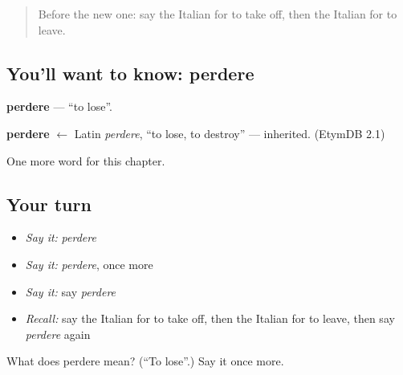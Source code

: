 \label{lesson:IT-C234-perdere}



\begin{quote}
Before the new one: say the Italian for to take off, then the Italian for to leave.
\end{quote}

\subsection*{You'll want to know: perdere}
\textbf{perdere} — \textquotedblleft{}to lose\textquotedblright{}.

\begin{cousinweb}
\textbf{perdere} $\leftarrow$ Latin \emph{perdere}, \textquotedblleft{}to lose, to destroy\textquotedblright{} — inherited. (EtymDB 2.1)
\end{cousinweb}

\begin{grammarlens}[title={What you've built}]
One more word for this chapter.
\end{grammarlens}

\subsection*{Your turn}
\begin{itemize}
\raggedright
  \item \emph{Say it:} \emph{perdere}
  \item \emph{Say it:} \emph{perdere}, once more
  \item \emph{Say it:} say \emph{perdere}
  \item \emph{Recall:} say the Italian for to take off, then the Italian for to leave, then say \emph{perdere} again
\end{itemize}

\begin{tcolorbox}[breakable,colback=teal!4,colframe=teal!35!black,title={Before you move on}]
What does perdere mean? (\textquotedblleft{}To lose\textquotedblright{}.) Say it once more.
\end{tcolorbox}

